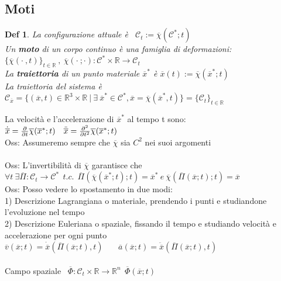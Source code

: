 \documentclass{article}
\theoremstyle{unnumbered}
\newtheorem* {theoremT}{Def}
\theoremstyle{unnumbered1}
\newenvironment{defi}{\begin{gBox}\begin{theoremT}}{\end{theoremT}\end{gBox}}
\begin{document}
\subsection{Moti}
%
\begin{defi}
La configurazione attuale è \ $\mathcal{C}_t := \overline{\chi}(\mathcal{C}^*;t)$\\
%
Un \textbf{moto} di un corpo continuo è una famiglia di deformazioni: \ $\{ \overline{\chi}(\cdot\ ,t) \}_{t\in\mathbb{R}} \ , \ \overline{\chi}(\cdot\ ;\cdot) : \mathcal{C}^*\times\mathbb{R}\rightarrow \mathcal{C}_t $ \\
La \textbf{traiettoria} di un punto materiale $\overline{x}^*$ è $\overline{x}(t) := \overline{\chi}(\overline{x}^*;t)$ \\
La traiettoria del sistema è $\mathcal{C}_{\overline{x}}=\{ (\overline{x},t)\in\mathbb{R}^3\times\mathbb{R} \ |\ \exists\ \overline{x}^*\in \mathcal{C}^* , \overline{x}=\overline{\chi}(\overline{x}^*,t) \}=\{\mathcal{C}_t\}_{t\in\mathbb{R}}$
\end{defi}
%
%
La velocità e l'accelerazione di $\overline{x}^*$ al tempo t sono: \ $\dot{\overline{x}}=\frac{\partial}{\partial t}\overline{\chi}(\overline{x}^*;t) \ \ \ \Ddot{\overline{x}}=\frac{\partial^2}{\partial t^2} \overline{\chi}(\overline{x}^*;t)$\\
%
Oss: Assumeremo sempre che $\overline{\chi}$ sia $C^2$ nei suoi argomenti \\ \\
%
%
%
Oss: L'invertibilità di $\overline{\chi}$ garantisce che 
$\forall t \ \exists \overline{\Pi}: \mathcal{C}_t\rightarrow\mathcal{C}^* \ \ t.c. \ \ \overline{\Pi}(\overline{\chi}(\overline{x}^*;t);t)=\overline{x}^* \ e \ \overline{\chi}(\overline{\Pi}(\overline{x};t);t)=\overline{x}$\\
%
Oss: Posso vedere lo spostamento in due modi:\\
\phantom{Oss: }1) Descrizione Lagrangiana o materiale, prendendo i punti e studiandone l'evoluzione nel tempo\\
\phantom{Oss: }2) Descrizione Euleriana o spaziale, fissando il tempo e studiando velocità e accelerazione per ogni punto\\
\phantom{Oss: 2) }$\overline{v}(\overline{x};t)=\dot{\overline{x}}(\overline{\Pi}(\overline{x};t),t)$ \ \ \ $\overline{a}(\overline{x};t)=\ddot{\overline{x}}(\overline{\Pi}(\overline{x};t),t)$ \\ \\
%
%
%
Campo spaziale \ $\overline{\Phi}:\mathcal{C}_t\times\mathbb{R}\rightarrow\mathbb{R}^n \ \ \overline{\Phi}(\overline{x};t)$ \ \ \
\end{document}
